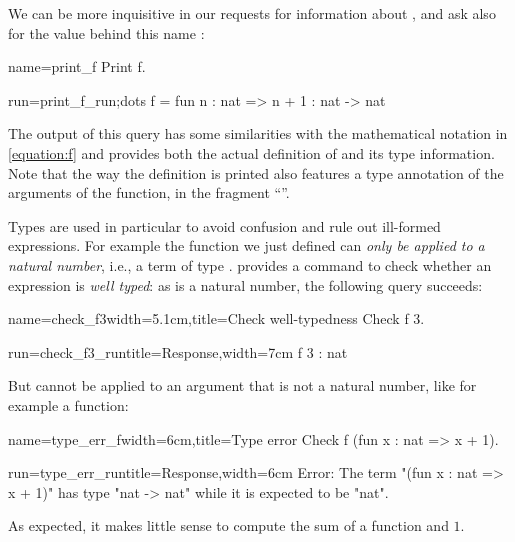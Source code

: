 We can be more inquisitive in our requests for information about
, and ask also for the value behind this name :

\begin{coq-left}{name=print_f}{}
Print f.
$~$
\end{coq-left}
\begin{coqout-right}{run=print_f_run;dots}{}
f = fun n : nat => n + 1
  : nat -> nat
\end{coqout-right}

The output of this  query has some similarities with the
 mathematical notation in \eqref{equation:f} and provides both the
 actual definition of  and its type information. Note that the way
 the definition is printed also features a type annotation of the
 arguments of the function, in the fragment ``''.

Types are used in particular to avoid confusion and rule out
ill-formed expressions.
For example the function  we just defined can \emph{only be
  applied to a natural number}, i.e., a term of type .
\Coq{} provides a command to check whether
an expression is \emph{well typed}:
 as  is a natural number, the following query succeeds:

\begin{coq-left}{name=check_f3}{width=5.1cm,title=Check well-typedness}
Check f 3.
\end{coq-left}
\begin{coqout-right}{run=check_f3_run}{title=Response,width=7cm}
 f 3 : nat
\end{coqout-right}
But  cannot be applied to an argument that is not a natural number,
like for example a function:

\begin{coq-left}{name=type_err_f}{width=6cm,title=Type error}
Check f (fun x : nat => x + 1).
$~$
$~$
\end{coq-left}
\begin{coqout-right}{run=type_err_run}{title=Response,width=6cm}
Error:
The term "(fun x : nat => x + 1)"
has type "nat -> nat" while it is
expected to be "nat".
\end{coqout-right}
As expected, it makes little sense to compute the sum of a function and $1$.

